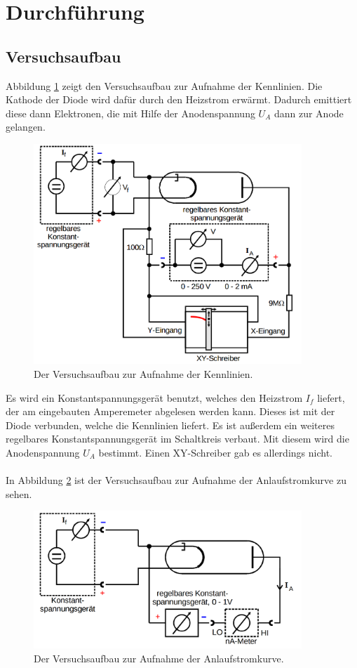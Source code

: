 \documentclass[
  bibliography=totoc,     %
  captions=tableheading,  %
  titlepage=firstiscover, %
]{scrartcl}
\begin{document}
\section{Durchführung}
\label{sec:durchführung}
\subsection{Versuchsaufbau}
\label{sec:aufbau}
Abbildung \ref{fig:V5041} zeigt den Versuchsaufbau zur Aufnahme der Kennlinien.
Die Kathode der Diode wird dafür durch den Heizstrom erwärmt. Dadurch emittiert diese dann Elektronen, die mit Hilfe der Anodenspannung $U_A$ dann zur Anode gelangen.
\begin{figure}[H]
  \centering
  \includegraphics[width=0.9\textwidth]{V5041.png}
  \caption{Der Versuchsaufbau zur Aufnahme der Kennlinien. \cite{anleitung}}
  \label{fig:V5041}
\end{figure}
\noindent
Es wird ein Konstantspannungsgerät benutzt, welches den Heizstrom $I_f$ liefert, der am eingebauten Amperemeter abgelesen werden kann. Dieses ist mit der Diode verbunden, welche die Kennlinien liefert. Es ist außerdem ein weiteres regelbares Konstantspannungsgerät im Schaltkreis verbaut. Mit diesem wird die Anodenspannung $U_A$ bestimmt. Einen XY-Schreiber gab es allerdings nicht.\\
\\
In Abbildung \ref{fig:V5042} ist der Versuchsaufbau zur Aufnahme der Anlaufstromkurve zu sehen.
\begin{figure}[H]
  \centering
  \includegraphics[width=0.9\textwidth]{V5042.png}
  \caption{Der Versuchsaufbau zur Aufnahme der Anlaufstromkurve. \cite{anleitung}}
  \label{fig:V5042}
\end{figure}
\end{document}

